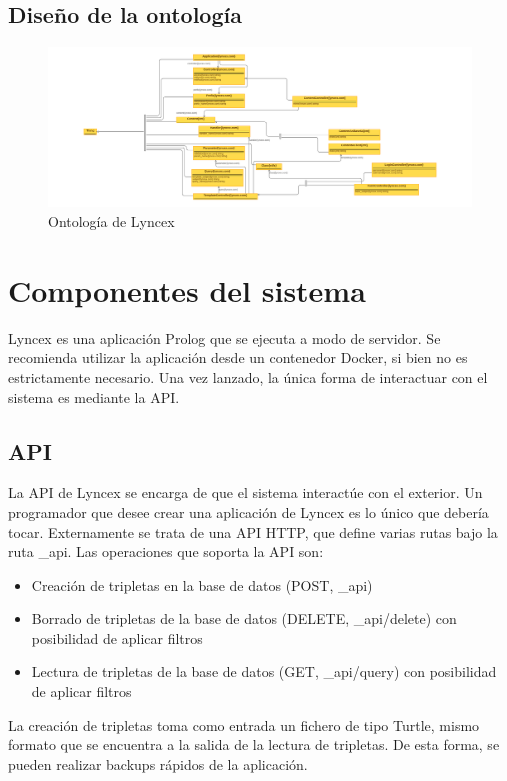 \documentclass[12pt]{report} %
\begin{document}
\section{Diseño de la ontología}

\begin{figure}[h]
    \centering
    \includegraphics[width=\textwidth]{lyncex.png}
    \caption{Ontología de Lyncex}
    \label{fig:ontologia}
\end{figure}

\chapter{Componentes del sistema}
Lyncex es una aplicación Prolog que se ejecuta a modo de servidor. Se recomienda utilizar la aplicación desde un contenedor Docker, si bien no es estrictamente necesario. 
Una vez lanzado, la única forma de interactuar con el sistema es mediante la API.

\section{API}
La API de Lyncex se encarga de que el sistema interactúe con el exterior.
Un programador que desee crear una aplicación de Lyncex es lo único que debería tocar.
Externamente se trata de una API HTTP, que define varias rutas bajo la ruta \_api.
Las operaciones que soporta la API son:
\begin{itemize}
    \item Creación de tripletas en la base de datos (POST, \_api)
    \item Borrado de tripletas de la base de datos (DELETE, \_api/delete) con posibilidad de aplicar filtros
    \item Lectura de tripletas de la base de datos (GET, \_api/query) con posibilidad de aplicar filtros
\end{itemize}

La creación de tripletas toma como entrada un fichero de tipo Turtle, mismo formato que se encuentra a la salida de la lectura de tripletas.
De esta forma, se pueden realizar backups rápidos de la aplicación.
\end{document}
